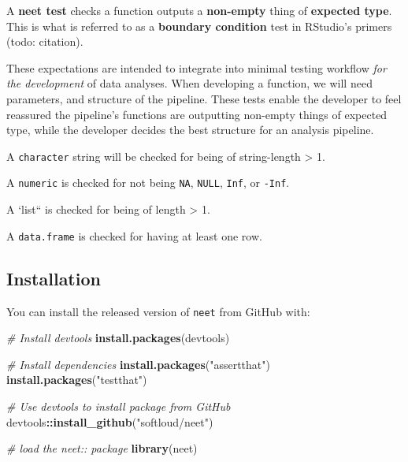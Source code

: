 \documentclass[
]{article}
\newenvironment{Shaded}{\begin{snugshade}}{\end{snugshade}}
\newcommand{\CommentTok}[1]{\textcolor[rgb]{0.56,0.35,0.01}{\textit{#1}}}
\newcommand{\KeywordTok}[1]{\textcolor[rgb]{0.13,0.29,0.53}{\textbf{#1}}}
\newcommand{\NormalTok}[1]{#1}
\newcommand{\OperatorTok}[1]{\textcolor[rgb]{0.81,0.36,0.00}{\textbf{#1}}}
\newcommand{\StringTok}[1]{\textcolor[rgb]{0.31,0.60,0.02}{#1}}
\begin{document}
A \textbf{neet test} checks a function outputs a \textbf{non-empty} thing of \textbf{expected type}. This is what is referred to as a \textbf{boundary condition} test in RStudio's primers (todo: citation).

These expectations are intended to integrate into minimal testing workflow
\emph{for the development} of data analyses. When developing a function, we will need parameters, and structure of the pipeline. These tests
enable the developer to feel reassured the pipeline's functions are
outputting non-empty things of expected type, while the developer decides the best structure for an analysis pipeline.

A \texttt{character} string will be checked for being of string-length \textgreater{} 1.

A \texttt{numeric} is checked for not being \texttt{NA}, \texttt{NULL}, \texttt{Inf}, or \texttt{-Inf}.

A `list`` is checked for being of length \textgreater{} 1.

A \texttt{data.frame} is checked for having at least one row.

\hypertarget{installation}{%
\subsection{Installation}\label{installation}}

You can install the released version of \texttt{neet} from GitHub with:

\begin{Shaded}
\begin{Highlighting}[]
\CommentTok{\# Install devtools}
\KeywordTok{install.packages}\NormalTok{(devtools) }

\CommentTok{\# Install dependencies}
\KeywordTok{install.packages}\NormalTok{(}\StringTok{"assertthat"}\NormalTok{)}
\KeywordTok{install.packages}\NormalTok{(}\StringTok{"testthat"}\NormalTok{)}

\CommentTok{\# Use devtools to install package from GitHub}
\NormalTok{devtools}\OperatorTok{::}\KeywordTok{install\_github}\NormalTok{(}\StringTok{"softloud/neet"}\NormalTok{)}
\end{Highlighting}
\end{Shaded}

\begin{Shaded}
\begin{Highlighting}[]
\CommentTok{\# load the neet:: package}
\KeywordTok{library}\NormalTok{(neet)}
\end{Highlighting}
\end{Shaded}
\end{document}
